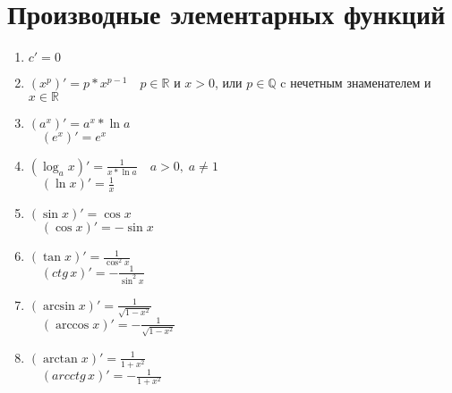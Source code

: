 \section{Производные элементарных функций}
\begin{enumerate}
    \item $c' = 0$
    \item $(x^p)' = p * x^{p - 1} \quad p \in \mathbb{R}$ и $x > 0$, или $p \in \mathbb{Q}$ c нечетным знаменателем и $x \in \mathbb{R}$
    \item $(a^x)' = a^x * \ln a$ \\
    $\quad (e^x)' = e^x$
    \item $(\log_a x)' = \frac{1}{x * \ln a} \quad a > 0, \; a \neq 1$ \\
    $\quad (\ln x)' = \frac{1}{x}$
    \item $(\sin x)' = \cos x$ \\
    $\quad (\cos x)' = -\sin x$
    \item $(\tan x)' = \frac{1}{\cos^2 x}$ \\
    $\quad (ctg \, x)' = -\frac{1}{\sin^2 x} $
    \item $(\arcsin x)' = \frac{1}{\sqrt{1 - x^2}}$ \\
    $\quad (\arccos x)' = -\frac{1}{\sqrt{1 - x^2}}$ 
    \item $(\arctan x)' = \frac{1}{1 + x^2}$ \\
    $\quad (arcctg \, x)' = - \frac{1}{1 + x^2}$
\end{enumerate}
